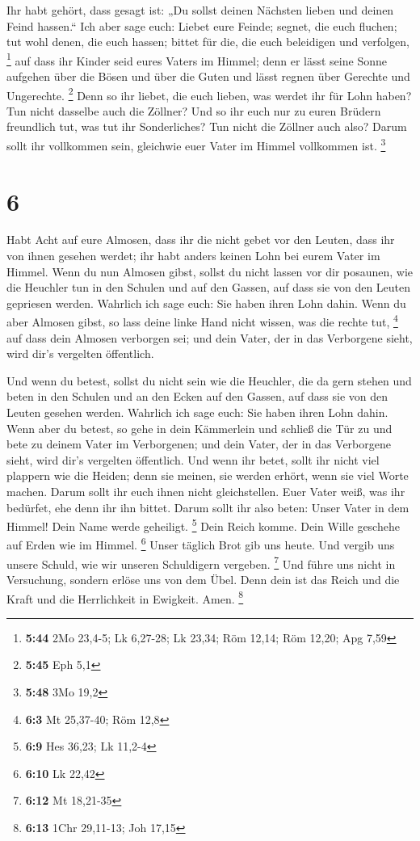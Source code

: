  Ihr habt gehört, dass gesagt ist: „Du sollst deinen
Nächsten lieben und deinen Feind hassen.``  Ich aber sage
euch: Liebet eure Feinde; segnet, die euch fluchen; tut wohl denen, die
euch hassen; bittet für die, die euch beleidigen und verfolgen,
\footnote{\textbf{5:44} 2Mo 23,4-5; Lk 6,27-28; Lk 23,34; Röm 12,14; Röm
  12,20; Apg 7,59}  auf dass ihr Kinder seid eures Vaters
im Himmel; denn er lässt seine Sonne aufgehen über die Bösen und über
die Guten und lässt regnen über Gerechte und Ungerechte. \footnote{\textbf{5:45}
  Eph 5,1}  Denn so ihr liebet, die euch lieben, was werdet
ihr für Lohn haben? Tun nicht dasselbe auch die Zöllner? 
Und so ihr euch nur zu euren Brüdern freundlich tut, was tut ihr
Sonderliches? Tun nicht die Zöllner auch also?  Darum sollt
ihr vollkommen sein, gleichwie euer Vater im Himmel vollkommen ist.
\footnote{\textbf{5:48} 3Mo 19,2}

\hypertarget{section-4}{%
\section{6}\label{section-4}}

 Habt Acht auf eure Almosen, dass ihr die nicht gebet vor
den Leuten, dass ihr von ihnen gesehen werdet; ihr habt anders keinen
Lohn bei eurem Vater im Himmel.  Wenn du nun Almosen gibst,
sollst du nicht lassen vor dir posaunen, wie die Heuchler tun in den
Schulen und auf den Gassen, auf dass sie von den Leuten gepriesen
werden. Wahrlich ich sage euch: Sie haben ihren Lohn dahin. 
Wenn du aber Almosen gibst, so lass deine linke Hand nicht wissen, was
die rechte tut, \footnote{\textbf{6:3} Mt 25,37-40; Röm 12,8}
 auf dass dein Almosen verborgen sei; und dein Vater, der in
das Verborgene sieht, wird dir's vergelten öffentlich.

 Und wenn du betest, sollst du nicht sein wie die Heuchler,
die da gern stehen und beten in den Schulen und an den Ecken auf den
Gassen, auf dass sie von den Leuten gesehen werden. Wahrlich ich sage
euch: Sie haben ihren Lohn dahin.  Wenn aber du betest, so
gehe in dein Kämmerlein und schließ die Tür zu und bete zu deinem Vater
im Verborgenen; und dein Vater, der in das Verborgene sieht, wird dir's
vergelten öffentlich.  Und wenn ihr betet, sollt ihr nicht
viel plappern wie die Heiden; denn sie meinen, sie werden erhört, wenn
sie viel Worte machen.  Darum sollt ihr euch ihnen nicht
gleichstellen. Euer Vater weiß, was ihr bedürfet, ehe denn ihr ihn
bittet.  Darum sollt ihr also beten: Unser Vater in dem
Himmel! Dein Name werde geheiligt. \footnote{\textbf{6:9} Hes 36,23; Lk
  11,2-4}  Dein Reich komme. Dein Wille geschehe auf Erden
wie im Himmel. \footnote{\textbf{6:10} Lk 22,42}  Unser
täglich Brot gib uns heute.  Und vergib uns unsere Schuld,
wie wir unseren Schuldigern vergeben. \footnote{\textbf{6:12} Mt
  18,21-35}  Und führe uns nicht in Versuchung, sondern
erlöse uns von dem Übel. Denn dein ist das Reich und die Kraft und die
Herrlichkeit in Ewigkeit. Amen. \footnote{\textbf{6:13} 1Chr 29,11-13;
  Joh 17,15}

